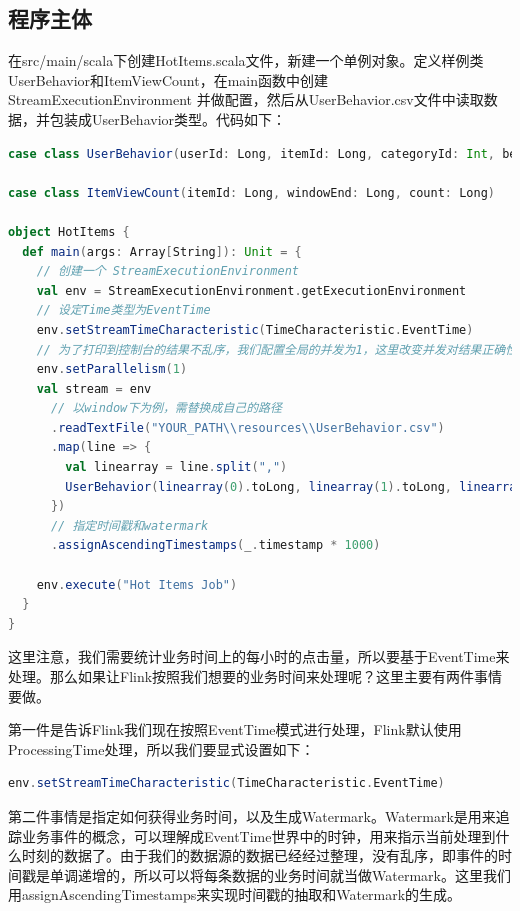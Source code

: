 \documentclass[oneside]{ctexbook}
\begin{document}
\subsection{程序主体}

在src/main/scala下创建HotItems.scala文件，新建一个单例对象。定义样例类UserBehavior和ItemViewCount，在main函数中创建StreamExecutionEnvironment 并做配置，然后从UserBehavior.csv文件中读取数据，并包装成UserBehavior类型。代码如下：

\begin{lstlisting}[language=scala, caption=HotItemsAnalysis/src/main/scala/HotItems.scala]
case class UserBehavior(userId: Long, itemId: Long, categoryId: Int, behavior: String, timestamp: Long)

case class ItemViewCount(itemId: Long, windowEnd: Long, count: Long)
 
object HotItems {
  def main(args: Array[String]): Unit = {
    // 创建一个 StreamExecutionEnvironment
    val env = StreamExecutionEnvironment.getExecutionEnvironment
    // 设定Time类型为EventTime
    env.setStreamTimeCharacteristic(TimeCharacteristic.EventTime)
    // 为了打印到控制台的结果不乱序，我们配置全局的并发为1，这里改变并发对结果正确性没有影响
    env.setParallelism(1)
    val stream = env
      // 以window下为例，需替换成自己的路径
      .readTextFile("YOUR_PATH\\resources\\UserBehavior.csv")
      .map(line => {
        val linearray = line.split(",")
        UserBehavior(linearray(0).toLong, linearray(1).toLong, linearray(2).toInt, linearray(3), linearray(4).toLong)
      })
      // 指定时间戳和watermark
      .assignAscendingTimestamps(_.timestamp * 1000)

    env.execute("Hot Items Job")
  }
}
\end{lstlisting}

这里注意，我们需要统计业务时间上的每小时的点击量，所以要基于EventTime来处理。那么如果让Flink按照我们想要的业务时间来处理呢？这里主要有两件事情要做。

第一件是告诉Flink我们现在按照EventTime模式进行处理，Flink默认使用ProcessingTime处理，所以我们要显式设置如下：

\begin{lstlisting}[language=scala]
env.setStreamTimeCharacteristic(TimeCharacteristic.EventTime)
\end{lstlisting}

第二件事情是指定如何获得业务时间，以及生成Watermark。Watermark是用来追踪业务事件的概念，可以理解成EventTime世界中的时钟，用来指示当前处理到什么时刻的数据了。由于我们的数据源的数据已经经过整理，没有乱序，即事件的时间戳是单调递增的，所以可以将每条数据的业务时间就当做Watermark。这里我们用assignAscendingTimestamps来实现时间戳的抽取和Watermark的生成。
\end{document}
